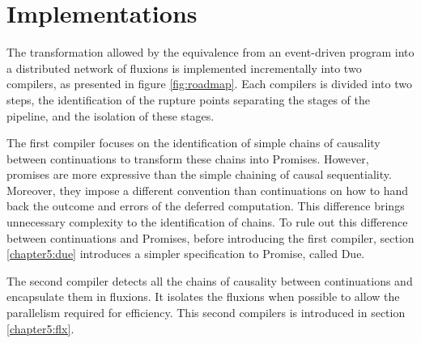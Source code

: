 \eject
\renewcommand{\glyph}{\iconfont{\XeTeXglyph287}}
\chapter{Implementations} \label{chapter5}
\localtableofcontents %
\eject
The transformation allowed by the equivalence from an event-driven program into a distributed network of fluxions is implemented incrementally into two compilers, as presented in figure \ref{fig:roadmap}.
Each compilers is divided into two steps, the identification of the rupture points separating the stages of the pipeline, and the isolation of these stages.

\begin{figure}[h!]%
\end{figure}

The first compiler focuses on the identification of simple chains of causality between continuations to transform these chains into Promises.
However, promises are more expressive than the simple chaining of causal sequentiality.
Moreover, they impose a different convention than continuations on how to hand back the outcome and errors of the deferred computation.
This difference brings unnecessary complexity to the identification of chains.
To rule out this difference between continuations and Promises, before introducing the first compiler, section \ref{chapter5:due} introduces a simpler specification to Promise, called Due.

The second compiler detects all the chains of causality between continuations and encapsulate them in fluxions.
It isolates the fluxions when possible to allow the parallelism required for efficiency.
This second compilers is introduced in section \ref{chapter5:flx}.



% 
